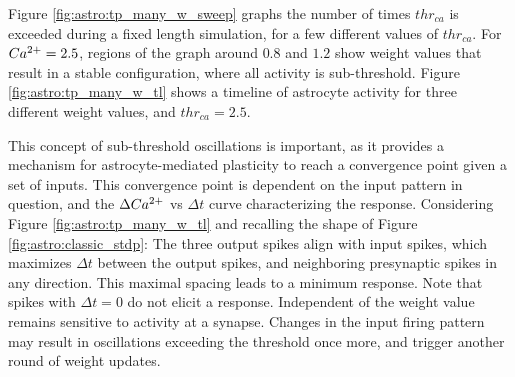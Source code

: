 
Figure \ref{fig:astro:tp_many_w_sweep} graphs the number of times $thr_{ca}$ is
exceeded during a fixed length simulation, for a few different values of
$thr_{ca}$. For $Ca^{2+}=2.5$, regions of the graph around $0.8$ and $1.2$ show
weight values that result in a stable configuration, where all \ca activity is
sub-threshold. Figure \ref{fig:astro:tp_many_w_tl} shows
a timeline of astrocyte activity for three different weight values, and
$thr_{ca}=2.5$.



This concept of sub-threshold oscillations is important, as it provides a
mechanism for astrocyte-mediated plasticity to reach a convergence point given a
set of inputs. This convergence point is dependent on the input pattern in
question, and the $\Delta Ca^{2+}$ vs $\Delta t$ curve characterizing the \ca
response. Considering Figure \ref{fig:astro:tp_many_w_tl} and recalling the
shape of Figure \ref{fig:astro:classic_stdp}: The three output spikes align with
input spikes, which maximizes $\Delta t$ between the output spikes, and
neighboring presynaptic spikes in any direction. This maximal spacing leads to a
minimum \ca response. Note that spikes with $\Delta t=0$ do not elicit a \ca
response. Independent of the weight value \ca remains sensitive to activity at a
synapse. Changes in the input firing pattern may result in \ca oscillations
exceeding the threshold once more, and trigger another round of weight updates.


